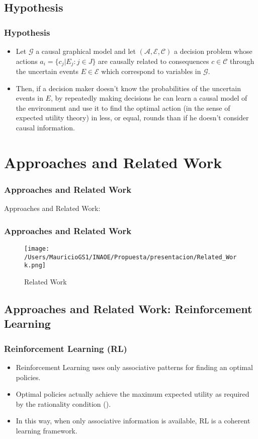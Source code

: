 \documentclass{beamer}
\theoremstyle{plain}
\begin{document}
	\subsection{Hypothesis}
	\begin{frame}
	\frametitle{Hypothesis}
	\begin{itemize}
	\item Let $\mathcal{G}$ a causal graphical model and let $(\mathcal{A},\mathcal{E},\mathcal{C})$ a decision problem whose actions $a_i = \{ c_j | E_j : j \in J \}$  are causally related to consequences $c \in \mathcal{C}$ through the uncertain events $E \in \mathcal{E}$ which correspond to variables in $\mathcal{G}$.
	\item Then, if a decision maker doesn't know the probabilities of the uncertain events in $E$, by repeatedly making decisions he can learn a causal model of the environment and use it to find the optimal action (in the sense of expected utility theory) in less, or equal, rounds than if he doesn't consider causal information.
	\end{itemize}
	\end{frame}

\section{Approaches and Related Work}
\begin{frame}
\frametitle{Approaches and Related Work}
Approaches and Related Work:
\end{frame}
\begin{frame}
\frametitle{Approaches and Related Work}
\begin{figure}[ht]
\vskip 0.2in
\begin{center}
\texttt{[image: /Users/MauricioGS1/INAOE/Propuesta/presentacion/Related\_Work.png]}
\caption{Related Work}
\end{center}
\vskip -0.2in
\end{figure}
\end{frame} 

\subsection{Approaches and Related Work: Reinforcement Learning}
\begin{frame}
\frametitle{Reinforcement Learning (RL)}
\begin{itemize}
\item Reinforcement Learning uses only associative patterns for finding an optimal policies.
\item Optimal policies actually achieve the maximum expected utility as required by the rationality condition (\cite{webb2007game}).
\item In this way, when only associative information is available, RL is a coherent learning framework. 
\end{itemize}
\end{frame}
\end{document}

